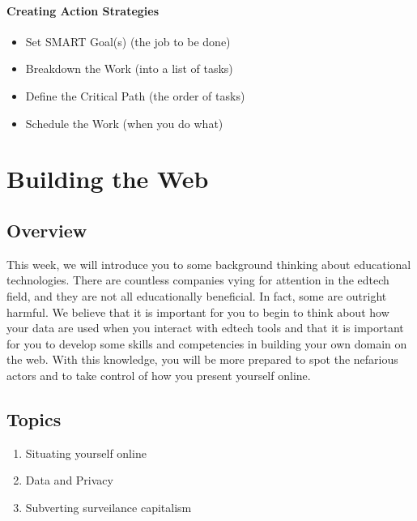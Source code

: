 \documentclass[
]{book}
\providecommand{\tightlist}{%
  \setlength{\itemsep}{0pt}\setlength{\parskip}{0pt}}
\begin{document}
\hypertarget{creating-action-strategies}{%
\subsubsection*{Creating Action Strategies}\label{creating-action-strategies}}

\begin{itemize}
\tightlist
\item
  Set SMART Goal(s) (the job to be done)
\item
  Breakdown the Work (into a list of tasks)
\item
  Define the Critical Path (the order of tasks)
\item
  Schedule the Work (when you do what)
\end{itemize}

\hypertarget{building-the-web}{%
\chapter{Building the Web}\label{building-the-web}}

\hypertarget{overview-3}{%
\section*{Overview}\label{overview-3}}

This week, we will introduce you to some background thinking about educational technologies. There are countless companies vying for attention in the edtech field, and they are not all educationally beneficial. In fact, some are outright harmful. We believe that it is important for you to begin to think about how your data are used when you interact with edtech tools and that it is important for you to develop some skills and competencies in building your own domain on the web. With this knowledge, you will be more prepared to spot the nefarious actors and to take control of how you present yourself online.

\hypertarget{topics-3}{%
\section*{Topics}\label{topics-3}}

\begin{enumerate}
\def\labelenumi{\arabic{enumi}.}
\tightlist
\item
  Situating yourself online
\item
  Data and Privacy
\item
  Subverting surveilance capitalism
\end{enumerate}
\end{document}
